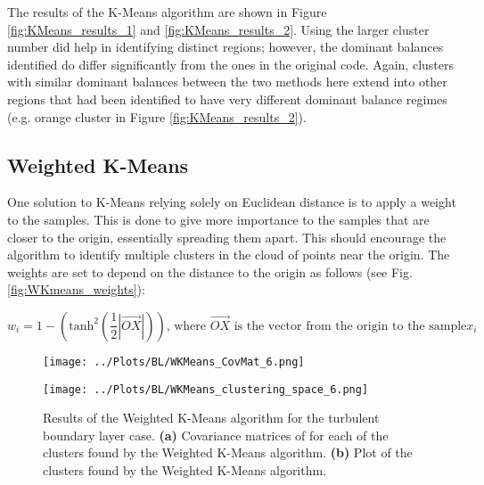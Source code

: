 \documentclass[12pt]{report} %
\begin{document}
The results of the K-Means algorithm are shown in Figure \ref{fig:KMeans_results_1} and \ref{fig:KMeans_results_2}. Using the larger cluster number did help in identifying distinct regions; however, the dominant balances identified do differ significantly from the ones in the original code. Again, clusters with similar dominant balances between the two methods here extend into other regions that had been identified to have very different dominant balance regimes (e.g. orange cluster in Figure \ref{fig:KMeans_results_2}).

\subsection{Weighted K-Means}

One solution to K-Means relying solely on Euclidean distance is to apply a weight to the samples. This is done to give more importance to the samples that are closer to the origin, essentially spreading them apart. This should encourage the algorithm to identify multiple clusters in the cloud of points near the origin. The weights are set to depend on the distance to the origin as follows (see Fig. \ref{fig:WKmeans_weights}):

\begin{equation}
  w_i = 1 - (\text{tanh}^{2}(\frac{1}{2}|\vec{OX}|)) \text{, where } \vec{OX} \text{ is the vector from the origin to the sample} x_i
\end{equation}

\begin{figure}[htbp]
  \centering
  \begin{minipage}{0.9\textwidth}
    \centering
    \texttt{[image: ../Plots/BL/WKMeans\_CovMat\_6.png]}
    \subcaption{}
  \end{minipage}

  \begin{minipage}{0.8\textwidth}
    \centering
    \texttt{[image: ../Plots/BL/WKMeans\_clustering\_space\_6.png]}
    \subcaption{}
  \end{minipage}

  \caption{Results of the Weighted K-Means algorithm for the turbulent boundary layer case. \textbf{(a)} Covariance matrices of for each of the clusters found by the Weighted K-Means algorithm. \textbf{(b)} Plot of the clusters found by the Weighted K-Means algorithm.}
  \label{fig:WKMeans_results_1}
\end{figure}
\end{document}
